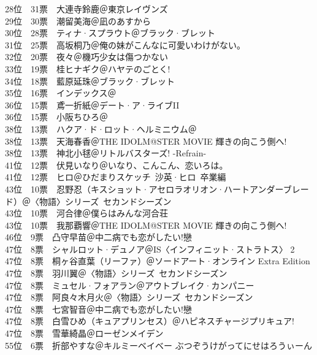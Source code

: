 { 28位　31票　大連寺鈴鹿＠東京レイヴンズ\\
 29位　30票　潮留美海＠凪のあすから\\
 30位　28票　ティナ·スプラウト＠ブラック·ブレット\\
 31位　25票　高坂桐乃＠俺の妹がこんなに可愛いわけがない。\\
 32位　20票　夜々＠機巧少女は傷つかない\\
 33位　19票　桂ヒナギク＠ハヤテのごとく!\\
 34位　18票　藍原延珠＠ブラック·ブレット\\
 35位　16票　インデックス＠\Railgan\\
 36位　15票　鳶一折紙＠デート·ア·ライブII\\
 36位　15票　小阪ちひろ＠\Kaminomi\\
 38位　13票　ハクア·ド·ロット·ヘルミニウム＠\Kaminomi\\
 38位　13票　天海春香＠THE IDOLM@STER MOVIE 輝きの向こう側へ!\\
 38位　13票　神北小毬＠リトルバスターズ! -Refrain-\\
 41位　12票　伏見いなり＠いなり、こんこん、恋いろは。\\
 41位　12票　ヒロ＠ひだまりスケッチ~沙英·ヒロ~卒業編\\
 43位　10票　忍野忍（キスショット·アセロラオリオン·ハートアンダーブレード）＠〈物語〉シリーズ~セカンドシーズン\\
 43位　10票　河合律＠僕らはみんな河合荘\\
 43位　10票　我那覇響＠THE IDOLM@STER MOVIE 輝きの向こう側へ!\\
 46位　9票　凸守早苗＠中二病でも恋がしたい!戀\\
 47位　8票　シャルロット·デュノア＠IS〈インフィニット·ストラトス〉 2\\
 47位　8票　桐ヶ谷直葉（リーファ）＠ソードアート·オンライン Extra Edition\\
 47位　8票　羽川翼＠〈物語〉シリーズ~セカンドシーズン\\
 47位　8票　ミュセル·フォアラン＠アウトブレイク·カンパニー\\
 47位　8票　阿良々木月火＠〈物語〉シリーズ~セカンドシーズン\\
 47位　8票　七宮智音＠中二病でも恋がしたい!戀\\
 47位　8票　白雪ひめ（キュアプリンセス）＠ハピネスチャージプリキュア!\\
 47位　8票　雪華綺晶＠ローゼンメイデン\\
 55位　6票　折部やすな＠キルミーベイベー ぶつぞうけがってにせはろうぃーん\\
}
